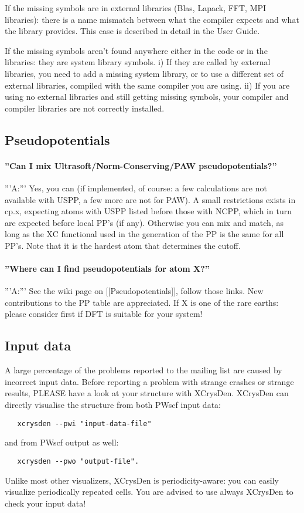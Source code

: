\documentclass[12pt,a4paper]{article}
\begin{document}
If the missing symbols are in external libraries (Blas, Lapack, FFT,
MPI libraries): 
there is a name mismatch between what the compiler expects and what the
library provides. This case is described in detail in the User Guide.

If the missing symbols aren't found anywhere either in the code or in the
libraries: they are system library symbols. i) If they are called by external 
libraries, you need to add a missing system library, or to use a different 
set of external libraries, compiled with the same compiler you are using. 
ii) If you are using no external libraries and still getting missing symbols, 
your compiler and compiler libraries are not correctly installed.

\subsection{Pseudopotentials}

\paragraph{ ''Can I mix Ultrasoft/Norm-Conserving/PAW pseudopotentials?''}
'''A:''' Yes, you can (if implemented, of course: a few calculations
are not available with USPP, a few more are not for PAW). A small
restrictions exists in cp.x, expecting atoms with USPP listed before 
those with NCPP, which in turn are expected before local PP's (if any).
Otherwise you can mix and match, as long as the XC functional used in 
the generation of the PP is the same for all PP's. Note that 
it is the hardest atom that determines the cutoff.

\paragraph{ ''Where can I find pseudopotentials for atom X?''}
'''A:''' See the wiki page on [[Pseudopotentials]], follow those
links. New contributions to the PP table are appreciated. 
If X is one of the rare earths: please consider first if DFT is 
suitable for your system!

\subsection{Input data}

A large percentage of the problems reported to the mailing list are
caused by incorrect input data. Before reporting a problem with
strange crashes or strange results, PLEASE have
a look at your structure with XCrysDen. XCrysDen can directly
visualise the structure from both PWscf input data:
\begin{verbatim}
   xcrysden --pwi "input-data-file"
\end{verbatim}
and from PWscf output as well:
\begin{verbatim}
   xcrysden --pwo "output-file".
\end{verbatim}
Unlike most other visualizers, XCrysDen is periodicity-aware: you can
easily visualize periodically repeated cells.
You are advised to use  always XCrysDen to check your input data! 
\end{document}

